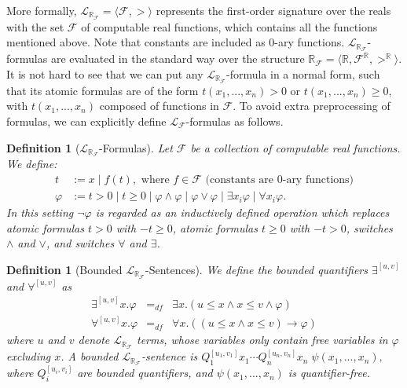 \documentclass[10pt]{article}
\theoremstyle{plain}
\newtheorem{definition}[theorem]{Definition}
\theoremstyle{definition}
\newcommand{\lrf}{\mathcal{L}_{\mathbb{R}_{\mathcal{F}}}}
\begin{document}
More formally, $\lrf = \langle \mathcal{F}, > \rangle$ represents the first-order signature over the reals with the set $\mathcal{F}$ of computable real functions, which contains all the functions mentioned above. Note that constants are included as 0-ary functions. $\lrf$-formulas are evaluated in the standard way over the structure $\mathbb{R}_{\mathcal{F}}= \langle \mathbb{R}, \mathcal{F}^{\mathbb{R}}, >^{\mathbb{R}}\rangle$. It is not hard to see that  we can put any $\lrf$-formula in a normal form, such that its atomic formulas are of the form $t(x_1,...,x_n)>0$ or $t(x_1,...,x_n)\geq 0$, with $t(x_1,...,x_n)$ composed of functions in $\mathcal{F}$. To avoid extra preprocessing of formulas, we can explicitly define $\mathcal{L}_{\mathcal{F}}$-formulas as follows.
\begin{definition}[$\lrf$-Formulas]
Let $\mathcal{F}$ be a collection of computable real functions. We define:
\begin{align*}
t& := x \; | \; f(t), \mbox{ where }f\in \mathcal{F} \mbox{ (constants are 0-ary functions)}\\
\varphi& := t> 0 \; | \; t\geq 0 \; | \; \varphi\wedge\varphi
\; | \; \varphi\vee\varphi \; | \; \exists x_i\varphi \; |\; \forall x_i\varphi.
\end{align*}
In this setting $\neg\varphi$ is regarded as an inductively defined operation
which replaces atomic formulas $t>0$ with $-t\geq 0$, atomic formulas $t\geq 0$
with $-t>0$, switches $\wedge$ and $\vee$, and switches $\forall$ and $\exists$.
\end{definition}
\begin{definition}[Bounded $\lrf$-Sentences]
We define the bounded quantifiers $\exists^{[u,v]}$ and $\forall^{[u,v]}$ as
\begin{eqnarray*}
\exists^{[u,v]}x.\varphi &=_{df}&\exists x. ( u \leq x \land x \leq v \wedge
\varphi)\\
\forall^{[u,v]}x.\varphi &=_{df}& \forall x. ( (u \leq x \land x \leq v)
\rightarrow \varphi)
\end{eqnarray*}
where $u$ and $v$ denote $\lrf$ terms, whose variables only
contain free variables in $\varphi$ excluding $x$. A {\em bounded $\lrf$-sentence} is
$Q_1^{[u_1,v_1]}x_1\cdots Q_n^{[u_n,v_n]}x_n\;\psi(x_1,...,x_n),$ where $Q_i^{[u_i,v_i]}$ are bounded quantifiers, and $\psi(x_1,...,x_n)$ is
quantifier-free.
\end{definition}
\end{document}
